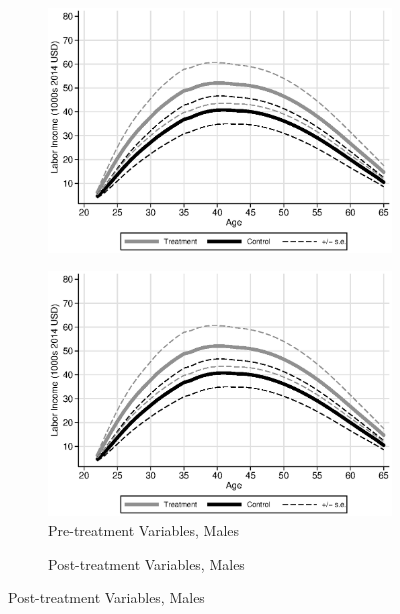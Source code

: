 \begin{figure}
\begin{subfigure}[h]{0.25\textwidth}
		\includegraphics[width=\textwidth]{output/labor_20-65_pset1_mset1_male_sensitivity.eps}
\end{subfigure}%
\begin{subfigure}[h]{0.25\textwidth}
		\centering
		\caption{Pre-treatment Variables, Males}
		\includegraphics[width=\textwidth]{output/labor_20-65_pset1_mset1_male_sensitivity.eps}
\end{subfigure}%
\begin{subfigure}[h]{0.25\textwidth}
	\centering
	\caption{Post-treatment Variables, Males}

\end{subfigure}
\end{figure}
